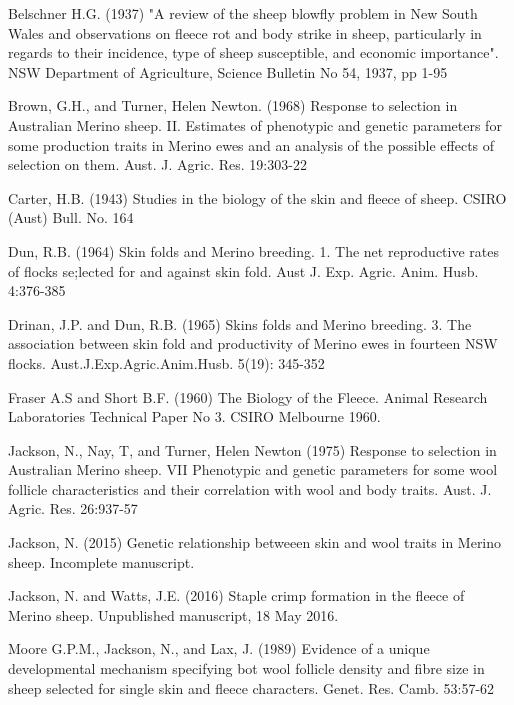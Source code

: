 \documentclass[titlepage]{article}  %
\begin{document}
\begin{thebibliography}{99}

Belschner H.G. (1937) "A review of the sheep blowfly problem in New South Wales and observations on fleece rot and body strike in sheep, particularly in regards to their incidence, type of sheep susceptible, and economic importance". NSW Department of Agriculture, Science Bulletin No 54, 1937, pp 1-95

Brown, G.H., and Turner, Helen Newton. (1968) Response to selection in Australian Merino sheep. II. Estimates of phenotypic and genetic parameters for some production traits in Merino ewes and an analysis of the possible effects of selection on them. Aust. J. Agric. Res. 19:303-22

Carter, H.B. (1943) Studies in the biology of the skin and fleece of sheep. CSIRO (Aust) Bull. No. 164
 
Dun, R.B. (1964) Skin folds and Merino breeding. 1. The net reproductive rates of flocks se;lected for and against skin fold. Aust J. Exp. Agric. Anim. Husb. 4:376-385

Drinan, J.P. and Dun, R.B. (1965) Skins folds and Merino breeding. 3. The association between skin fold and productivity of Merino ewes in fourteen NSW flocks. Aust.J.Exp.Agric.Anim.Husb. 5(19): 345-352

Fraser A.S and Short B.F. (1960) The Biology of the Fleece. Animal Research Laboratories Technical Paper No 3. CSIRO Melbourne 1960.

Jackson, N., Nay, T, and Turner, Helen Newton (1975) Response to selection in Australian Merino sheep. VII Phenotypic and genetic parameters for some wool follicle characteristics and their correlation with wool and body traits. Aust. J. Agric. Res. 26:937-57

Jackson, N. (2015) Genetic relationship betweeen skin and wool traits in Merino sheep. Incomplete manuscript.

Jackson, N. and Watts, J.E. (2016) Staple crimp formation in the fleece of Merino sheep. Unpublished manuscript, 18 May 2016.

Moore G.P.M., Jackson, N., and Lax, J. (1989) Evidence of a unique developmental mechanism specifying bot wool follicle density and fibre size in sheep selected for single skin and fleece characters. Genet. Res. Camb. 53:57-62


\end{thebibliography}
\end{document}
